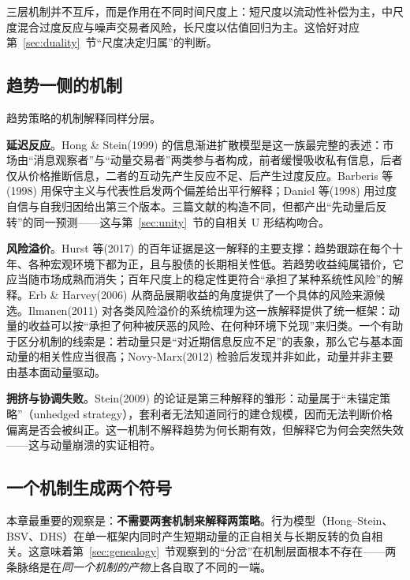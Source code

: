三层机制并不互斥，而是作用在不同时间尺度上：短尺度以流动性补偿为主，中尺度混合过度反应与噪声交易者风险，长尺度以估值回归为主。这恰好对应第~\ref{sec:duality}~节“尺度决定归属”的判断。

\subsection{趋势一侧的机制}

趋势策略的机制解释同样分层。

\textbf{延迟反应}。Hong \& Stein(1999) 的信息渐进扩散模型是这一族最完整的表述：市场由“消息观察者”与“动量交易者”两类参与者构成，前者缓慢吸收私有信息，后者仅从价格推断信息，二者的互动先产生反应不足、后产生过度反应\cite{hongstein1999}。Barberis 等(1998) 用保守主义与代表性启发两个偏差给出平行解释\cite{bsv1998}；Daniel 等(1998) 用过度自信与自我归因给出第三个版本\cite{dhs1998}。三篇文献的构造不同，但都产出“先动量后反转”的同一预测——这与第~\ref{sec:unity}~节的自相关 U 形结构吻合。

\textbf{风险溢价}。Hurst 等(2017) 的百年证据是这一解释的主要支撑：趋势跟踪在每个十年、各种宏观环境下都为正，且与股债的长期相关性低\cite{hop2017}。若趋势收益纯属错价，它应当随市场成熟而消失；百年尺度上的稳定性更符合“承担了某种系统性风险”的解释。Erb \& Harvey(2006) 从商品展期收益的角度提供了一个具体的风险来源候选\cite{erbharvey2006}。Ilmanen(2011) 对各类风险溢价的系统梳理为这一族解释提供了统一框架：动量的收益可以按“承担了何种被厌恶的风险、在何种环境下兑现”来归类\cite{ilmanen2011}。一个有助于区分机制的线索是：若动量只是“对近期信息反应不足”的表象，那么它与基本面动量的相关性应当很高；Novy-Marx(2012) 检验后发现并非如此，动量并非主要由基本面动量驱动\cite{novymarx2012}。

\textbf{拥挤与协调失败}。Stein(2009) 的论证是第三种解释的雏形：动量属于“未锚定策略”（unhedged strategy），套利者无法知道同行的建仓规模，因而无法判断价格偏离是否会被纠正\cite{stein2009}。这一机制不解释趋势为何长期有效，但解释它为何会突然失效——这与动量崩溃的实证相符\cite{danielmoskowitz2016}。

\subsection{一个机制生成两个符号}

本章最重要的观察是：\textbf{不需要两套机制来解释两策略}。行为模型（Hong--Stein、BSV、DHS）在单一框架内同时产生短期动量的正自相关与长期反转的负自相关。这意味着第~\ref{sec:genealogy}~节观察到的“分岔”在机制层面根本不存在——两条脉络是在\emph{同一个机制的产物}上各自取了不同的一端。

